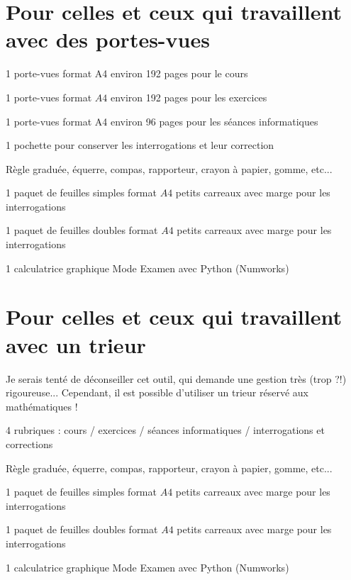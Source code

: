\documentclass[11pt,a4paper]{article}  %
\begin{document}
\section*{Pour celles et ceux qui travaillent avec des portes-vues}
 
\begin{itemMet}
	\item 1 porte-vues format A4 environ 192 pages pour le cours
	\item 1 porte-vues format $A 4$ environ 192 pages pour les exercices
	\item 1 porte-vues format A4 environ 96 pages pour les séances informatiques
	\item 1 pochette pour conserver les interrogations et leur correction
	\item Règle graduée, équerre, compas, rapporteur, crayon à papier, gomme, etc...
	\item 1 paquet de feuilles simples format $A 4$ petits carreaux avec marge pour les interrogations 
	\item 1 paquet de feuilles doubles format $A 4$ petits carreaux avec marge pour les interrogations
	\item 1 calculatrice graphique Mode Examen avec Python (Numworks)
\end{itemMet}

\section*{Pour celles et ceux qui travaillent avec un trieur}

Je serais tenté de déconseiller cet outil, qui demande une gestion très (trop ?!) rigoureuse... Cependant, il est possible d'utiliser un trieur réservé aux mathématiques !
\begin{itemMet}
	\item 4 rubriques : cours / exercices / séances informatiques / interrogations et corrections
	\item Règle graduée, équerre, compas, rapporteur, crayon à papier, gomme, etc...
	\item 1 paquet de feuilles simples format $A 4$ petits carreaux avec marge pour les interrogations 
	\item 1 paquet de feuilles doubles format $A 4$ petits carreaux avec marge pour les interrogations
	\item 1 calculatrice graphique Mode Examen avec Python (Numworks)
\end{itemMet}
\end{document}
